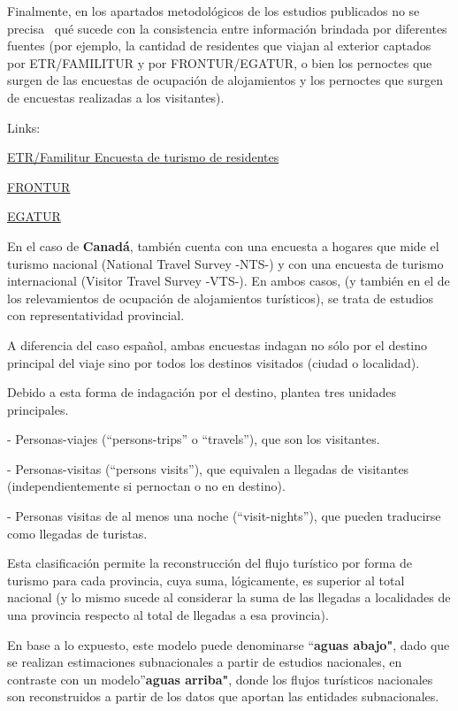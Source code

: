 \documentclass[
  openany]{book}
\begin{document}
Finalmente, en los apartados metodológicos de los estudios publicados no se precisa~ qué sucede con la consistencia entre información brindada por diferentes fuentes (por ejemplo, la cantidad de residentes que viajan al exterior captados por ETR/FAMILITUR y por FRONTUR/EGATUR, o bien los pernoctes que surgen de las encuestas de ocupación de alojamientos y los pernoctes que surgen de encuestas realizadas a los visitantes).

Links:

\href{https://www.ine.es/dyngs/INEbase/es/operacion.htmc=Estadistica_C\&cid=1254736176990\&menu=ultiDatos\&idp=1254735576863}{ETR/Familitur Encuesta de turismo de residentes}

\href{https://www.ine.es/dyngs/INEbase/es/operacion.htmc=Estadistica_C\&cid=1254736176996\&menu=ultiDatos\&idp=1254735576863}{FRONTUR}

\href{https://www.ine.es/dyngs/INEbase/es/operacion.htmc=Estadistica_C\&cid=1254736177002\&menu=ultiDatos\&idp=1254735576863}{EGATUR}

En el caso de \textbf{Canadá}, también cuenta con una encuesta a hogares que mide el turismo nacional (National Travel Survey -NTS-) y con una encuesta de turismo internacional (Visitor Travel Survey -VTS-). En ambos casos, (y también en el de los relevamientos de ocupación de alojamientos turísticos), se trata de estudios con representatividad provincial.

A diferencia del caso español, ambas encuestas indagan no sólo por el destino principal del viaje sino por todos los destinos visitados (ciudad o localidad).

Debido a esta forma de indagación por el destino, plantea tres unidades principales.

- Personas-viajes (``persons-trips'' o ``travels''), que son los visitantes.

- Personas-visitas (``persons visits''), que equivalen a llegadas de visitantes (independientemente si pernoctan o no en destino).

- Personas visitas de al menos una noche (``visit-nights''), que pueden traducirse como llegadas de turistas.

Esta clasificación permite la reconstrucción del flujo turístico por forma de turismo para cada provincia, cuya suma, lógicamente, es superior al total nacional (y lo mismo sucede al considerar la suma de las llegadas a localidades de una provincia respecto al total de llegadas a esa provincia).

En base a lo expuesto, este modelo puede denominarse ``\textbf{aguas abajo"}, dado que se realizan estimaciones subnacionales a partir de estudios nacionales, en contraste con un modelo''\textbf{aguas arriba"}, donde los flujos turísticos nacionales son reconstruidos a partir de los datos que aportan las entidades subnacionales.
\end{document}
